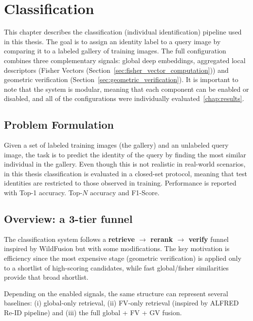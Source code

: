 \chapter{Classification}
\label{chap:classification}

This chapter describes the classification (individual identification) pipeline used in this thesis. The goal is to assign an identity label to a 
query image by comparing it to a labeled gallery of training images. The full configuration combines three complementary signals: global deep embeddings,
 aggregated local descriptors (Fisher Vectors (Section~\ref{sec:fisher_vector_computation})) and geometric verification (Section~\ref{sec:geometric_verification}). It is important 
 to note that the system is modular, meaning that each component can be enabled or disabled, and all of the configurations were individually evaluated~\ref{chap:results}.


\section{Problem Formulation}
\label{sec:problem_formulation}
Given a set of labeled training images (the gallery) and an unlabeled query image, the task is to predict the identity of the query by finding the most similar individual in the gallery. Even though this is not realistic in real-world scenarios, in this thesis classification is evaluated in a closed-set protocol, meaning that test identities are restricted to those observed in training. Performance is reported with Top-1 accuracy. Top-$N$ accuracy and F1-Score.  

\section{Overview: a 3-tier funnel}
The classification system follows a \textbf{retrieve $\rightarrow$ rerank $\rightarrow$ verify} funnel inspired by WildFusion\cite{cermak2024wildfusionindividualanimalidentification} but with some modifications. The key motivation is efficiency since the most expensive stage (geometric verification) is applied only to a shortlist of high-scoring candidates, while fast global/fisher similarities provide that broad shortlist. 

Depending on the enabled signals, the same structure can represent several baselines:
(i) global-only retrieval, (ii) FV-only retrieval (inspired by ALFRED Re-ID pipeline\cite{springerSpeciesAgnosticPatterned}) and (iii) the full global + FV + GV fusion.

